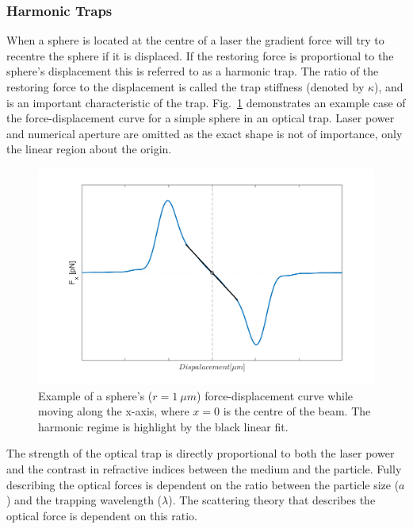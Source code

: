 \subsubsection{Harmonic Traps}
\label{sec:harmonic_traps}
When a sphere is located at the centre of a laser the gradient 
force will try to recentre the sphere if it is displaced. If 
the restoring force is proportional to the sphere's displacement 
this is referred to as a harmonic trap. The ratio of the restoring 
force to the displacement is called the trap stiffness (denoted 
by $\kappa$), and is an important characteristic of the trap. Fig.~\ref{fig:harmonic_trap} demonstrates an example case of the
force-displacement curve for a simple sphere in an optical trap. 
Laser power and numerical aperture are omitted as the exact shape 
is not of importance, only the linear region about the origin.
\begin{figure}[h!]
	\centering
	\includegraphics[width=1.1\linewidth]{sphere_force_curve.png}
	\caption{Example of a sphere's ($r=1\ \mu m$) force-displacement curve 
			while moving along the x-axis, where $x=0$ is the centre of the
			beam. The harmonic regime is highlight by the black linear fit.}
	\label{fig:harmonic_trap}
\end{figure}

The strength of the optical trap is directly proportional to 
both the laser power and the contrast in refractive indices 
between the medium and the particle. Fully describing the 
optical forces is dependent on the ratio between the particle 
size ($a$) and the trapping wavelength ($\lambda$). The 
scattering theory that describes the optical force is dependent 
on this ratio.  

